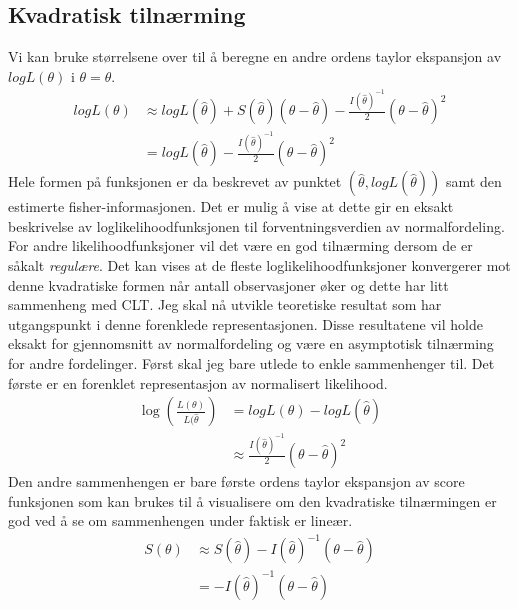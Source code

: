 \subsection{Kvadratisk tilnærming}
Vi kan bruke størrelsene over til å beregne en andre ordens taylor ekspansjon av $logL(\theta)$ i $\theta=\hat{\theta}$.
\begin{align}
logL(\theta) &\approx logL(\hat{\theta}) + S(\hat{\theta})(\theta-\hat{\theta})-\frac{I(\hat{\theta})^{-1}}{2}(\theta-\hat{\theta})^2\\
& = logL(\hat{\theta})-\frac{I(\hat{\theta})^{-1}}{2}(\theta-\hat{\theta})^2
\end{align}
Hele formen på funksjonen er da beskrevet av punktet $(\hat{\theta},logL(\hat{\theta}))$ samt den estimerte fisher-informasjonen. Det er mulig å vise at dette gir en eksakt beskrivelse av loglikelihoodfunksjonen til forventningsverdien av normalfordeling. For andre likelihoodfunksjoner vil det være en god tilnærming dersom de er såkalt \textit{regulære}. Det kan vises at de fleste loglikelihoodfunksjoner konvergerer mot denne kvadratiske formen når antall observasjoner øker og dette har litt sammenheng med CLT. Jeg skal nå utvikle teoretiske resultat som har utgangspunkt i denne forenklede representasjonen. Disse resultatene vil holde eksakt for gjennomsnitt av normalfordeling og være en asymptotisk tilnærming for andre fordelinger. Først skal jeg bare utlede to enkle sammenhenger til. Det første er en forenklet representasjon av normalisert likelihood.
\begin{align}
\log \left(\frac{L(\theta)}{L(\hat{\theta}}\right) &= logL(\theta)-logL(\hat{\theta}) \\
&\approx\frac{I(\hat{\theta})^{-1}}{2}(\theta-\hat{\theta})^2
\end{align}
Den andre sammenhengen er bare første ordens taylor ekspansjon av score funksjonen som kan brukes til å visualisere om den kvadratiske tilnærmingen er god ved å se om sammenhengen under faktisk er lineær.
\begin{align}
S(\theta) &\approx S(\hat{\theta}) - I(\hat{\theta})^{-1}(\theta-\hat{\theta}) \\
&=- I(\hat{\theta})^{-1}(\theta-\hat{\theta})
\end{align}
